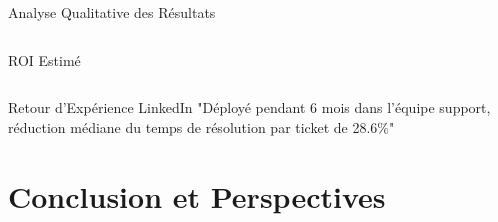 \documentclass[10pt, aspectratio=169]{beamer}
\begin{document}
\begin{frame}{Analyse Qualitative des Résultats}
\begin{columns}[T]
        \begin{column}{0.4\textwidth}
            \begin{block}{ROI Estimé}
                \begin{center}
                \end{center}
            \end{block}
        \end{column}
    \end{columns}
    
    \vspace{0.3cm}
    \begin{alertblock}{Retour d'Expérience LinkedIn}
        \footnotesize
        "Déployé pendant 6 mois dans l'équipe support, réduction médiane du temps de résolution par ticket de 28.6\%"
    \end{alertblock}
\end{frame}

\section{Conclusion et Perspectives}
\end{document}
